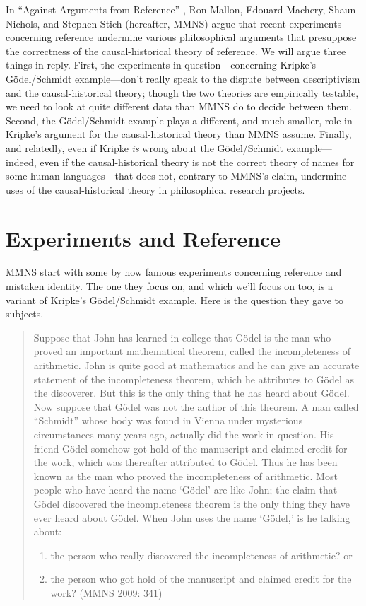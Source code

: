 In ``Against Arguments from Reference'' \citep{MMNS2009}, Ron Mallon, Edouard Machery, Shaun Nichols, and Stephen Stich (hereafter, MMNS) argue that recent experiments concerning reference undermine various philosophical arguments that presuppose the correctness of the causal-historical theory of reference. We will argue three things in reply. First, the experiments in question---concerning Kripke's G\"{o}del\-/\-Schmidt example---don't really speak to the dispute between descriptivism and the causal-historical theory; though the two theories are empirically testable, we need to look at quite different data than MMNS do to decide between them. Second, the G\"{o}del\-/\-Schmidt example plays a different, and much smaller, role in Kripke's argument for the causal-historical theory than MMNS assume. Finally, and relatedly, even if Kripke \textit{is} wrong about the G\"{o}del\-/\-Schmidt example---indeed, even if the causal-historical theory is not the correct theory of names for some human languages---that does not, contrary to MMNS's claim, undermine uses of the causal-historical theory in philosophical research projects.

\section{Experiments and Reference}

MMNS start with some by now famous experiments concerning reference and mistaken identity. The one they focus on, and which we'll focus on too, is a variant of Kripke's G\"{o}del\-/\-Schmidt example. Here is the question they gave to subjects.

\begin{quote}
Suppose that John has learned in college that G\"{o}del is the man who proved an important mathematical theorem, called the incompleteness of arithmetic. John is quite good at mathematics and he can give an accurate statement of the incompleteness theorem, which he attributes to G\"{o}del as the discoverer. But this is the only thing that he has heard about G\"{o}del. Now suppose that G\"{o}del was not the author of this theorem. A man called ``Schmidt'' whose body was found in Vienna under mysterious circumstances many years ago, actually did the work in question. His friend G\"{o}del somehow got hold of the manuscript and claimed credit for the work, which was thereafter attributed to G\"{o}del. Thus he has been known as the man who proved the incompleteness of arithmetic. Most people who have heard the name `G\"{o}del' are like John; the claim that G\"{o}del discovered the incompleteness theorem is the only thing they have ever heard about G\"{o}del. When John uses the name `G\"{o}del,' is he talking about:
\begin{enumerate}
\renewcommand{\labelenumi}{(\Alph{enumi})}
\item the person who really discovered the incompleteness of arithmetic? or
\item the person who got hold of the manuscript and claimed credit for the work? (MMNS 2009: 341)
\end{enumerate}
\end{quote}

